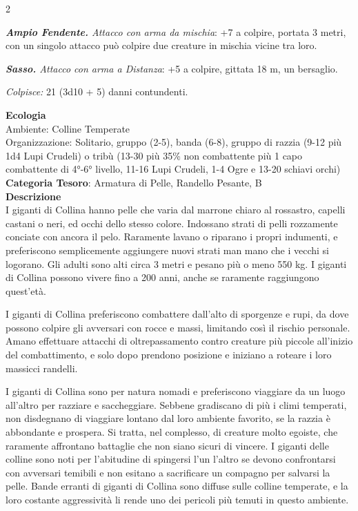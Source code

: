 \begin{multicols}{2}
{\emph{\textbf{Ampio Fendente.} Attacco con arma da mischia}: +7 a colpire, portata 3 metri, con un singolo attacco può colpire due creature in mischia vicine tra loro.

\emph{\textbf{Sasso.} Attacco con arma a Distanza}: +5 a colpire, gittata 18 m, un bersaglio.

\emph{Colpisce:} 21 (3d10 + 5) danni contundenti.

\textbf{Ecologia}\\
Ambiente: Colline Temperate\\
Organizzazione: Solitario, gruppo (2-5), banda (6-8), gruppo di razzia (9-12 più 1d4 Lupi Crudeli) o tribù (13-30 più 35\% non combattente più 1 capo combattente di 4°-6° livello, 11-16 Lupi Crudeli, 1-4 Ogre e 13-20 schiavi orchi)\\
\textbf{Categoria Tesoro}: Armatura di Pelle, Randello Pesante, B\\
\textbf{Descrizione}\\
I giganti di Collina hanno pelle che varia dal marrone chiaro al rossastro, capelli castani o neri, ed occhi dello stesso colore. Indossano strati di pelli rozzamente conciate con ancora il pelo. Raramente lavano o riparano i propri indumenti, e preferiscono semplicemente aggiungere nuovi strati man mano che i vecchi si logorano. Gli adulti sono alti circa 3 metri e pesano più o meno 550 kg. I giganti di Collina possono vivere fino a 200 anni, anche se raramente raggiungono quest'età.

I giganti di Collina preferiscono combattere dall'alto di sporgenze e rupi, da dove possono colpire gli avversari con rocce e massi, limitando così il rischio personale. Amano effettuare attacchi di oltrepassamento contro creature più piccole all'inizio del combattimento, e solo dopo prendono posizione e iniziano a roteare i loro massicci randelli.

I giganti di Collina sono per natura nomadi e preferiscono viaggiare da un luogo all'altro per razziare e saccheggiare. Sebbene gradiscano di più i climi temperati, non disdegnano di viaggiare lontano dal loro ambiente favorito, se la razzia è abbondante e prospera. Si tratta, nel complesso, di creature molto egoiste, che raramente affrontano battaglie che non siano sicuri di vincere. I giganti delle colline sono noti per l'abitudine di spingersi l'un l'altro se devono confrontarsi con avversari temibili e non esitano a sacrificare un compagno per salvarsi la pelle. Bande erranti di giganti di Collina sono diffuse sulle colline temperate, e la loro costante aggressività li rende uno dei pericoli più temuti in questo ambiente.

}
\end{multicols}
